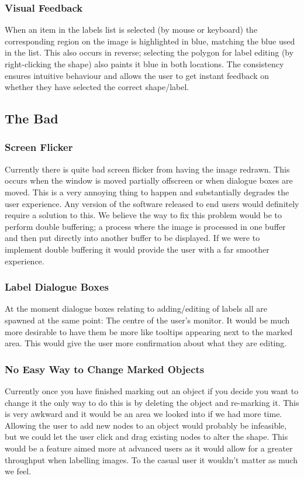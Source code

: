 \documentclass[a4paper,11pt,oneside]{article}
\begin{document}
\subsubsection{Visual Feedback}
When an item in the labels list is selected (by mouse or keyboard) the
corresponding region on the image is highlighted in blue, matching the blue
used in the list. This also occurs in reverse; selecting the polygon for label
editing (by right-clicking the shape) also paints it blue in both locations.
The consistency ensures intuitive behaviour and allows the user to get instant
feedback on whether they have selected the correct shape/label.

\subsection{The Bad}

\subsubsection{Screen Flicker}
Currently there is quite bad screen flicker from having the image redrawn.  This
occurs when the window is moved partially offscreen or when dialogue boxes are
moved.  This is a very annoying thing to happen and substantially degrades the
user experience. Any version of the software released to end users would
definitely require a solution to this.  We believe the way to fix this problem
would be to perform double buffering; a process where the image is processed in
one buffer and then put directly into another buffer to be displayed.  If we
were to implement double buffering it would provide the user with a far smoother
experience.

\subsubsection{Label Dialogue Boxes}
At the moment dialogue boxes relating to adding/editing of labels all are
spawned at the same point: The centre of the user's monitor.  It would be much
more desirable to have them be more like tooltips appearing next to the marked
area.  This would give the user more confirmation about what they are editing.

\subsubsection{No Easy Way to Change Marked Objects}
Currently once you have finished marking out an object if you decide you want to
change it the only way to do this is by deleting the object and re-marking it.
This is very awkward and it would be an area we looked into if we had more time.
Allowing the user to add new nodes to an object would probably be infeasible, 
but we could let the user click and drag existing nodes to alter the shape.  
This would be a feature aimed more at advanced users as it would allow for a
greater throughput when labelling images.  To the casual user it wouldn't matter
as much we feel.
\end{document}
